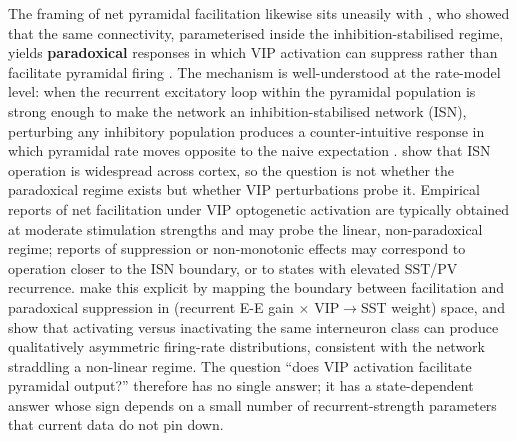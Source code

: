 \documentclass[11pt]{article}
\let\origrightarrow\rightarrow
\def\rightarrow{\ensuremath{\origrightarrow}}
\begin{document}
The \citep{Pi2013} framing of net pyramidal facilitation likewise sits uneasily with \citep{Garciadelmolino2017}, who showed that the same connectivity, parameterised inside the inhibition-stabilised regime, yields \textbf{paradoxical} responses in which VIP activation can suppress rather than facilitate pyramidal firing \citep{Reimann2026, Sanzeni2020}. The mechanism is well-understood at the rate-model level: when the recurrent excitatory loop within the pyramidal population is strong enough to make the network an inhibition-stabilised network (ISN), perturbing any inhibitory population produces a counter-intuitive response in which pyramidal rate moves opposite to the naive expectation \citep{Sanzeni2020, Garciadelmolino2017}. \citet{Sanzeni2020} show that ISN operation is widespread across cortex, so the question is not whether the paradoxical regime exists but whether VIP perturbations probe it. Empirical reports of net facilitation under VIP optogenetic activation \citep{Pi2013, Fu2014, Lee2013} are typically obtained at moderate stimulation strengths and may probe the linear, non-paradoxical regime; reports of suppression or non-monotonic effects \citep{Dipoppa2018, Veit2023, Bilash2023} may correspond to operation closer to the ISN boundary, or to states with elevated SST/PV recurrence. \citet{Garciadelmolino2017} make this explicit by mapping the boundary between facilitation and paradoxical suppression in (recurrent E-E gain $\times$ VIP\rightarrow SST weight) space, and \citet{Phillips2016} show that activating versus inactivating the same interneuron class can produce qualitatively asymmetric firing-rate distributions, consistent with the network straddling a non-linear regime. The question ``does VIP activation facilitate pyramidal output?'' therefore has no single answer; it has a state-dependent answer whose sign depends on a small number of recurrent-strength parameters that current data do not pin down.
\end{document}
